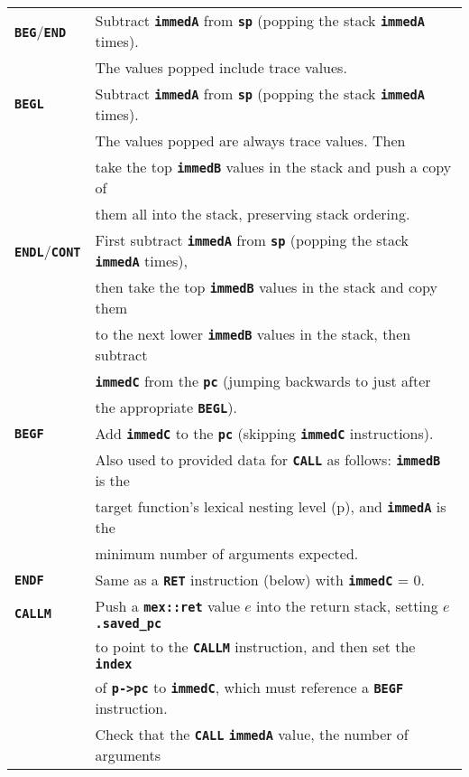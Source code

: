 \documentclass[12pt]{article}
\makeatletter
\newcommand{\TT}[1]{{\tt \bfseries #1}}
\newcommand{\ttkey}[1]{\TT{#1}\index{#1@{\tt #1}}}
\newcommand{\pagref}[1]{p\pageref{#1}}
\newlength{\figurewidth}
\newenvironment{boxedfigure}[1][!btp]%
	{\begin{figure*}[#1]
	 \begin{lrbox}{\figurebox}
	 \begin{minipage}{\figurewidth}

	 \vspace*{1ex}}%
	{
	 \vspace*{1ex}

	 \end{minipage}
	 \end{lrbox}

	 \centering
	 \fbox{\hspace*{0.1in}\usebox{\figurebox}\hspace*{0.1in}}
	 \end{figure*}}
\makeatother
\begin{document}
\begin{boxedfigure}

\begin{center}
\begin{tabular}{|l|l|}
\hline
\ttkey{BEG}/\ttkey{END}
    & Subtract \TT{immedA} from
      \TT{sp} (popping the stack \TT{immedA} times). \\
    & The values popped include trace values.
\\\hline
\ttkey{BEGL}
    & Subtract \TT{immedA} from
      \TT{sp} (popping the stack \TT{immedA} times). \\
    & The values popped are always trace values.  Then \\
    & take the top \TT{immedB} values in the stack and push a copy of \\
    & them all into the stack, preserving stack ordering.
\\\hline
\ttkey{ENDL}/\ttkey{CONT}
    & First subtract \TT{immedA} from \TT{sp}
      (popping the stack \TT{immedA} times), \\
    & then take the top \TT{immedB} values in the stack and copy them \\
    & to the next lower \TT{immedB} values in the stack, then subtract \\
    & \TT{immedC} from the \TT{pc} (jumping backwards to just after \\
    & the appropriate \TT{BEGL}).
\\\hline
\ttkey{BEGF}
    & Add \TT{immedC} to the \TT{pc} (skipping \TT{immedC} instructions).
    \\[0.5ex]
    & Also used to provided data for \TT{CALL} as follows: \TT{immedB} is the \\
    & target function's lexical nesting level (\pagref{LEXICAL-LEVEL}),
      and \TT{immedA} is the \\
    & minimum number of arguments expected.
\\\hline
\ttkey{ENDF}
    & Same as a \TT{RET} instruction (below) with \TT{immedC} = 0. 
\\\hline
\ttkey{CALLM}
    & Push a \TT{mex::ret} value $e$ into the return stack, setting
      \TT{$e$.saved\_pc} \\
    & to point to the \TT{CALLM} instruction, and then
      set the \TT{index} \\
    & of \TT{p->pc} to \TT{immedC}, which must reference a
      \TT{BEGF} instruction.
    \\[0.5ex]
    & Check that the \TT{CALL} \TT{immedA} value, the number of arguments \\

\end{tabular}
\end{center}
\end{boxedfigure}
\end{document}
